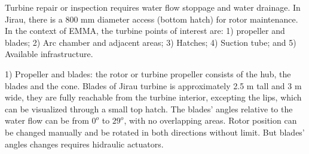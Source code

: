 Turbine repair or inspection requires water flow stoppage and water drainage. In
Jirau, there is a 800 mm diameter access (bottom hatch) for rotor maintenance.
In the context of EMMA, the turbine points of interest are: 1) propeller and
blades; 2) Arc chamber and adjacent areas; 3) Hatches; 4) Suction tube; and 5)
Available infrastructure.


1) Propeller and blades: the rotor or turbine propeller consists of the hub, the
blades and the cone. Blades of Jirau turbine is approximately 2.5 m tall
and 3 m wide, they are fully reachable from the turbine interior, excepting
the lips, which can be visualized through a small top hatch. The blades' angles
relative to the water flow can be from $0^o$ to $29^o$, with no overlapping
areas.
Rotor position can be changed manually and be rotated in both directions without
limit. But blades' angles changes requires hidraulic actuators.

